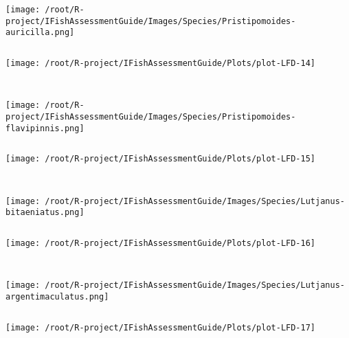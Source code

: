 \documentclass{report}\usepackage[]{graphicx}\usepackage[]{color}
\makeatletter
\def\maxwidth{ %
  \ifdim\Gin@nat@width>\linewidth
    \linewidth
  \else
    \Gin@nat@width
  \fi
}
\newenvironment{kframe}{%
 \def\at@end@of@kframe{}%
 \ifinner\ifhmode%
  \def\at@end@of@kframe{\end{minipage}}%
  \begin{minipage}{\columnwidth}%
 \fi\fi%
 \def\FrameCommand##1{\hskip\@totalleftmargin \hskip-\fboxsep
 \colorbox{shadecolor}{##1}\hskip-\fboxsep
     \hskip-\linewidth \hskip-\@totalleftmargin \hskip\columnwidth}%
 \MakeFramed {\advance\hsize-\width
   \@totalleftmargin\z@ \linewidth\hsize
   \@setminipage}}%
 {\par\unskip\endMakeFramed%
 \at@end@of@kframe}
\newenvironment{knitrout}{}{} %
\makeatother
\begin{document}
\begin{knitrout}
\begin{kframe}
\begin{verbatim}
\end{verbatim}
\end{kframe}
\texttt{[image: /root/R-project/IFishAssessmentGuide/Images/Species/Pristipomoides-auricilla.png]}
\begin{kframe}\begin{verbatim}
\end{verbatim}
\end{kframe}
\texttt{[image: /root/R-project/IFishAssessmentGuide/Plots/plot-LFD-14]} 
\begin{kframe}\begin{verbatim}
 
\end{verbatim}
\end{kframe}
\texttt{[image: /root/R-project/IFishAssessmentGuide/Images/Species/Pristipomoides-flavipinnis.png]}
\begin{kframe}\begin{verbatim}
\end{verbatim}
\end{kframe}
\texttt{[image: /root/R-project/IFishAssessmentGuide/Plots/plot-LFD-15]} 
\begin{kframe}\begin{verbatim}
 
\end{verbatim}
\end{kframe}
\texttt{[image: /root/R-project/IFishAssessmentGuide/Images/Species/Lutjanus-bitaeniatus.png]}
\begin{kframe}\begin{verbatim}
\end{verbatim}
\end{kframe}
\texttt{[image: /root/R-project/IFishAssessmentGuide/Plots/plot-LFD-16]} 
\begin{kframe}\begin{verbatim}
 
\end{verbatim}
\end{kframe}
\texttt{[image: /root/R-project/IFishAssessmentGuide/Images/Species/Lutjanus-argentimaculatus.png]}
\begin{kframe}\begin{verbatim}
\end{verbatim}
\end{kframe}
\texttt{[image: /root/R-project/IFishAssessmentGuide/Plots/plot-LFD-17]} 
\begin{kframe}\begin{verbatim}
 

\end{verbatim}
\end{kframe}
\end{knitrout}
\end{document}
